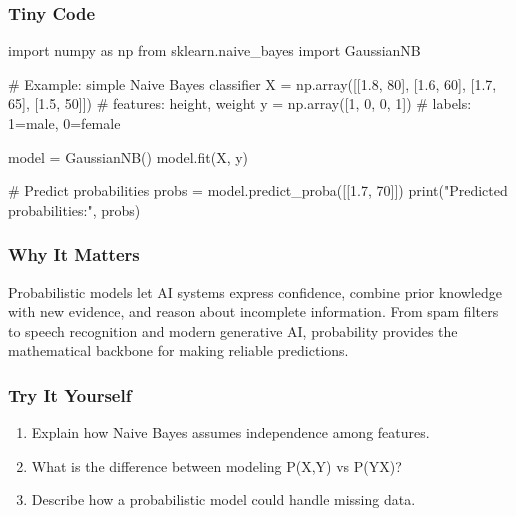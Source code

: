 \documentclass[
  letterpaper,
  DIV=11,
  numbers=noendperiod]{scrreprt}
\newenvironment{Shaded}{\begin{snugshade}}{\end{snugshade}}
\newcommand{\BuiltInTok}[1]{\textcolor[rgb]{0.00,0.23,0.31}{#1}}
\newcommand{\CommentTok}[1]{\textcolor[rgb]{0.37,0.37,0.37}{#1}}
\newcommand{\DecValTok}[1]{\textcolor[rgb]{0.68,0.00,0.00}{#1}}
\newcommand{\FloatTok}[1]{\textcolor[rgb]{0.68,0.00,0.00}{#1}}
\newcommand{\ImportTok}[1]{\textcolor[rgb]{0.00,0.46,0.62}{#1}}
\newcommand{\NormalTok}[1]{\textcolor[rgb]{0.00,0.23,0.31}{#1}}
\newcommand{\OperatorTok}[1]{\textcolor[rgb]{0.37,0.37,0.37}{#1}}
\newcommand{\StringTok}[1]{\textcolor[rgb]{0.13,0.47,0.30}{#1}}
\providecommand{\tightlist}{%
  \setlength{\itemsep}{0pt}\setlength{\parskip}{0pt}}
\begin{document}
\subsubsection{Tiny Code}\label{tiny-code-129}

\begin{Shaded}
\begin{Highlighting}[]
\ImportTok{import}\NormalTok{ numpy }\ImportTok{as}\NormalTok{ np}
\ImportTok{from}\NormalTok{ sklearn.naive\_bayes }\ImportTok{import}\NormalTok{ GaussianNB}

\CommentTok{\# Example: simple Naive Bayes classifier}
\NormalTok{X }\OperatorTok{=}\NormalTok{ np.array([[}\FloatTok{1.8}\NormalTok{, }\DecValTok{80}\NormalTok{], [}\FloatTok{1.6}\NormalTok{, }\DecValTok{60}\NormalTok{], [}\FloatTok{1.7}\NormalTok{, }\DecValTok{65}\NormalTok{], [}\FloatTok{1.5}\NormalTok{, }\DecValTok{50}\NormalTok{]])  }\CommentTok{\# features: height, weight}
\NormalTok{y }\OperatorTok{=}\NormalTok{ np.array([}\DecValTok{1}\NormalTok{, }\DecValTok{0}\NormalTok{, }\DecValTok{0}\NormalTok{, }\DecValTok{1}\NormalTok{])  }\CommentTok{\# labels: 1=male, 0=female}

\NormalTok{model }\OperatorTok{=}\NormalTok{ GaussianNB()}
\NormalTok{model.fit(X, y)}

\CommentTok{\# Predict probabilities}
\NormalTok{probs }\OperatorTok{=}\NormalTok{ model.predict\_proba([[}\FloatTok{1.7}\NormalTok{, }\DecValTok{70}\NormalTok{]])}
\BuiltInTok{print}\NormalTok{(}\StringTok{"Predicted probabilities:"}\NormalTok{, probs)}
\end{Highlighting}
\end{Shaded}

\subsubsection{Why It Matters}\label{why-it-matters-27}

Probabilistic models let AI systems express confidence, combine prior
knowledge with new evidence, and reason about incomplete information.
From spam filters to speech recognition and modern generative AI,
probability provides the mathematical backbone for making reliable
predictions.

\subsubsection{Try It Yourself}\label{try-it-yourself-129}

\begin{enumerate}
\def\labelenumi{\arabic{enumi}.}
\tightlist
\item
  Explain how Naive Bayes assumes independence among features.
\item
  What is the difference between modeling P(X,Y) vs P(Y\textbar X)?
\item
  Describe how a probabilistic model could handle missing data.
\end{enumerate}
\end{document}
